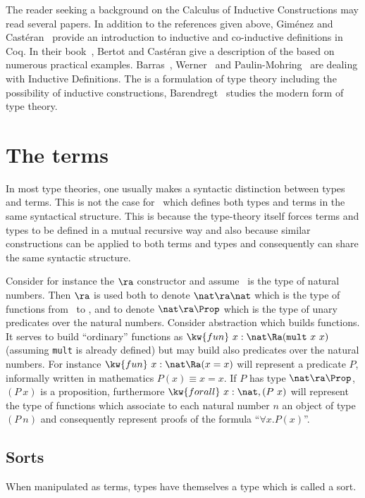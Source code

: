The reader seeking a background on the Calculus of Inductive
Constructions may read several papers. In addition to the references given above, Giménez and Castéran~\cite{GimCas05}
provide
an introduction to inductive and co-inductive definitions in Coq. In
their book~\cite{CoqArt}, Bertot and Castéran give a
description of the \CIC{} based on numerous practical examples.
Barras~\cite{Bar99}, Werner~\cite{Wer94} and
Paulin-Mohring~\cite{Moh97} are dealing with
Inductive Definitions. The {\CIC} is a
formulation of type theory including the possibility of inductive
constructions, Barendregt~\cite{Bar91} studies the modern form of type
theory.

\section[The terms]{The terms\label{Terms}}

In most type theories, one usually makes a syntactic distinction
between types and terms. This is not the case for \CIC\ which defines
both types and terms in the same syntactical structure. This is
because the type-theory itself forces terms and types to be defined in
a mutual recursive way and also because similar constructions can be
applied to both terms and types and consequently can share the same
syntactic structure.

Consider for instance the $\ra$ constructor and assume \nat\ is the
type of natural numbers. Then $\ra$ is used both to denote
$\nat\ra\nat$ which is the type of functions from \nat\ to \nat, and
to denote $\nat \ra \Prop$ which is the type of unary predicates over
the natural numbers. Consider abstraction which builds functions. It
serves to build ``ordinary'' functions as $\kw{fun}~x:\nat \Ra ({\tt mult} ~x~x)$ (assuming {\tt mult} is already defined) but may build also 
predicates over the natural numbers. For instance $\kw{fun}~x:\nat \Ra
(x=x)$ will
represent a predicate $P$, informally written in mathematics
$P(x)\equiv x=x$. If $P$ has type $\nat \ra \Prop$, $(P~x)$ is a
proposition, furthermore $\kw{forall}~x:\nat,(P~x)$ will represent the type of
functions which associate to each natural number $n$ an object of
type $(P~n)$ and consequently represent proofs of the formula
``$\forall x.P(x)$''.

\subsection[Sorts]{Sorts\label{Sorts}
}
When manipulated as terms, types have themselves a type which is called a sort.

